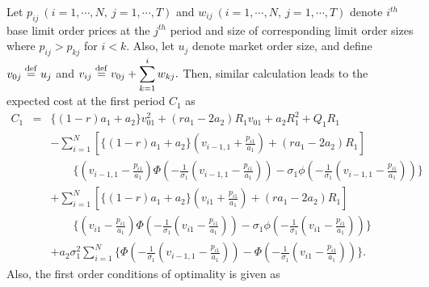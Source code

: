 Let $p_{ij}\ (i=1,\cdots,N, \ j=1,\cdots,T)$ and $w_{ij}\ (i=1,\cdots,N, \ j=1,\cdots,T)$ denote
$i^{th}$ base limit order prices at the $j^{th}$ period and size of corresponding limit order sizes
where $p_{ij}>p_{kj}$ for $i<k$.  Also, let $u_j$ denote market order size, and define $v_{0j} \stackrel{\mathrm{def}}{=} u_j$ and $\displaystyle v_{ij} \stackrel{\mathrm{def}}{=} v_{0j}+\sum_{k=1}^i w_{kj}.$  Then, similar calculation leads to the expected cost at the first period $C_1$ as
\begin{eqnarray}
  C_1 & = &  \{(1-r)a_1+a_2\}v_{01}^2+(ra_1-2a_2)R_1v_{01}+a_2R_1^2+Q_1R_1 \nonumber \\
      &   &  -\sum_{i=1}^N [\{(1-r)a_1+a_2\}(v_{i-1,1}+\frac{p_{i1}}{a_1})+(ra_1-2a_2)R_1] \nonumber \\
      &   & \quad \quad \{(v_{i-1,1}-\frac{p_{i1}}{a_1})\Phi(-\frac{1}{\sigma_1}(v_{i-1,1}-\frac{p_{i1}}{a_1}))-\sigma_1\phi(-\frac{1}{\sigma_1}(v_{i-1,1}-\frac{p_{i1}}{a_1}))\} \nonumber \\
      &   &  +\sum_{i=1}^N [\{(1-r)a_1+a_2\}(v_{i1}+\frac{p_{i1}}{a_1})+(ra_1-2a_2)R_1] \nonumber \\
      &   & \quad \quad \{(v_{i1}-\frac{p_{i1}}{a_1})\Phi(-\frac{1}{\sigma_1}(v_{i1}-\frac{p_{i1}}{a_1}))-\sigma_1\phi(-\frac{1}{\sigma_1}(v_{i1}-\frac{p_{i1}}{a_1}))\} \nonumber \\
      &   &  +a_2\sigma_1^2\sum_{i=1}^N \{\Phi(-\frac{1}{\sigma_1}(v_{i-1,1}-\frac{p_{i1}}{a_1}))-\Phi(-\frac{1}{\sigma_1}(v_{i1}-\frac{p_{i1}}{a_1}))\}. \label{eq_l35}
\end{eqnarray}
Also, the first order conditions of optimality is given as
